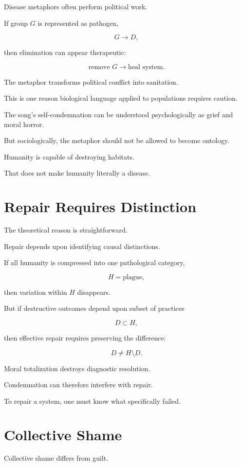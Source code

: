 \documentclass[11pt,oneside]{book}
\theoremstyle{definition}
\theoremstyle{remark}
\begin{document}
Disease metaphors often perform political work.

If group \(G\) is represented as pathogen,

\[
G\rightarrow D,
\]

then elimination can appear therapeutic:

\[
\text{remove }G
\rightarrow
\text{heal system}.
\]

The metaphor transforms political conflict into sanitation.

This is one reason biological language applied to populations requires caution.

The song's self-condemnation can be understood psychologically as grief and moral horror.

But sociologically, the metaphor should not be allowed to become ontology.

Humanity is capable of destroying habitats.

That does not make humanity literally a disease.

\section{Repair Requires Distinction}

The theoretical reason is straightforward.

Repair depends upon identifying causal distinctions.

If all humanity is compressed into one pathological category,

\[
H=\text{plague},
\]

then variation within \(H\) disappears.

But if destructive outcomes depend upon subset of practices

\[
D\subset H,
\]

then effective repair requires preserving the difference:

\[
D\neq H\setminus D.
\]

Moral totalization destroys diagnostic resolution.

Condemnation can therefore interfere with repair.

To repair a system, one must know what specifically failed.

\section{Collective Shame}

Collective shame differs from guilt.
\end{document}
